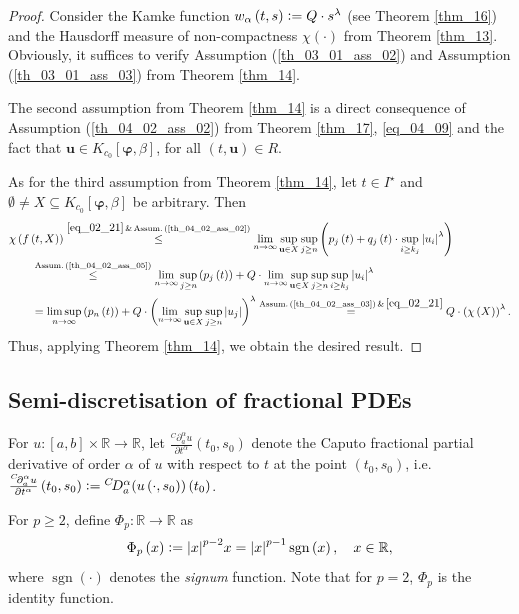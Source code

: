 \documentclass[reqno]{amsart}
\numberwithin{equation}{section}
\theoremstyle{definition}
\theoremstyle{remark}
\newcommand{\assumptionRef}[1]{\textrm{Assumption (\ref{#1})}}
\newcommand{\assumRef}[1]{\textrm{Assum.\,}\br{\textrm{\ref{#1}}}}
\newcommand{\ball}[3]{K_{#1}\sbr{#2,#3}}
\newcommand{\br}[1]{\left(#1\right)}
\newcommand{\bu}{\mathbf{u}}
\newcommand{\bvarphi}{\boldsymbol{\varphi}}
\newcommand{\DC}[3]{{}^{C}\!D^{#1}_{#2}{#3}}
\newcommand{\DCp}[4]{\frac{{}^{C}\!\partial^{#1}_{#2}{#3}}{\partial{#4}^{#1}}}
\newcommand{\defeq}{\vcentcolon=}
\newcommand{\eqText}[1]{\stackrel{#1}{=}}
\newcommand{\leqText}[1]{\stackrel{#1}{\leq}}
\newcommand{\R}{\mathbb{R}}
\newcommand{\sbr}[1]{\left[#1\right]}
\newcommand{\sgn}[1]{\sgnOperator\br{#1}}
\newcommand{\sI}{I^{\star}}
\newcommand{\st}{\!:}
\newcommand{\theoremRef}[1]{\textrm{Theorem \ref{#1}}}
\DeclareMathOperator{\sgnOperator}{sgn}
\begin{document}
	\begin{proof}
	Consider the Kamke function $w_{\alpha}\br{t,s}\defeq{Q}\cdot{s}^{\lambda}$ (see \theoremRef{thm_16}) and the Hausdorff measure of non-compactness $\chi\br{\cdot}$ from \theoremRef{thm_13}. Obviously, it suffices to verify \assumptionRef{th_03_01_ass_02} and \assumptionRef{th_03_01_ass_03} from \theoremRef{thm_14}.
	
	The second assumption from \theoremRef{thm_14} is a direct consequence of \assumptionRef{th_04_02_ass_02} from \theoremRef{thm_17}, \eqref{eq_04_09} and the fact that $\bu\in\ball{c_0}{\bvarphi}{\beta}$, for all $\br{t,\bu}\in{R}$.
	
	As for the third assumption from \theoremRef{thm_14}, let $t\in\sI$ and $\emptyset\neq{X}\subseteq\ball{c_0}{\bvarphi}{\beta}$ be arbitrary. Then
	\begin{equation*}
		\begin{aligned}
			&\chi\br{f\br{t,X}}\leqText{\eqref{eq_02_21}\,\&\,\assumRef{th_04_02_ass_02}}\lim_{n\rightarrow\infty}\sup_{\bu\in{X}}\sup_{j\geq{n}}\br{p_j\br{t}+q_j\br{t}\cdot\sup_{i\geq{k}_j}\abs{u_i}^{\lambda}}\\
			&\qquad\leqText{\assumRef{th_04_02_ass_05}}\lim_{n\rightarrow\infty}\sup_{j\geq{n}}\br{p_j\br{t}}+Q\cdot\lim_{n\rightarrow\infty}\sup_{\bu\in{X}}\sup_{j\geq{n}}\sup_{i\geq{k}_j}\abs{u_i}^{\lambda}\\
			&\qquad=\limsup_{n\rightarrow\infty}\br{p_n\br{t}}+Q\cdot\br{\lim_{n\rightarrow\infty}\sup_{\bu\in{X}}\sup_{j\geq{n}}\abs{u_j}}^{\lambda}\eqText{\assumRef{th_04_02_ass_03}\,\&\,\eqref{eq_02_21}}Q\cdot\br{\chi\br{X}}^{\lambda}.
		\end{aligned}
	\end{equation*}
	Thus, applying \theoremRef{thm_14}, we obtain the desired result.
	\end{proof}
	
	\subsection{Semi-discretisation of fractional PDEs}\label{sec_04_03}
	For $u\st\sbr{a,b}\times\R\rightarrow\R$, let $\DCp{\alpha}{a}{u}{t}\br{t_0,s_0}$ denote the Caputo fractional partial derivative of order $\alpha$ of $u$ with respect to $t$ at the point $\br{t_0,s_0}$, i.e. $\DCp{\alpha}{a}{u}{t}\br{t_0,s_0}\defeq\DC{\alpha}{a}{\br{u\br{\cdot,s_0}}}\br{t_0}$.
	
	For $p\geq2$, define $\Phi_p\st\R\rightarrow\R$ as
	\begin{equation*}
		\Phi_p\br{x}\defeq\abs{x}^{p-2}x=\abs{x}^{p-1}\sgn{x},\quad{x}\in\R,
	\end{equation*}
	where $\sgn{\cdot}$ denotes the \textit{signum} function. Note that for $p=2$, $\Phi_p$ is the identity function.
	
\end{document}
